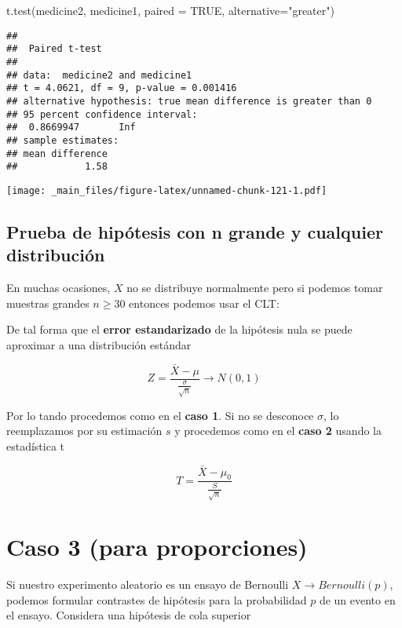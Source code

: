 \documentclass[
]{book}
\newenvironment{Shaded}{\begin{snugshade}}{\end{snugshade}}
\newcommand{\AttributeTok}[1]{\textcolor[rgb]{0.77,0.63,0.00}{#1}}
\newcommand{\ConstantTok}[1]{\textcolor[rgb]{0.00,0.00,0.00}{#1}}
\newcommand{\FunctionTok}[1]{\textcolor[rgb]{0.00,0.00,0.00}{#1}}
\newcommand{\NormalTok}[1]{#1}
\newcommand{\StringTok}[1]{\textcolor[rgb]{0.31,0.60,0.02}{#1}}
\begin{document}
\begin{Shaded}
\begin{Highlighting}[]
\FunctionTok{t.test}\NormalTok{(medicine2, medicine1,}
       \AttributeTok{paired =} \ConstantTok{TRUE}\NormalTok{,}
       \AttributeTok{alternative=}\StringTok{"greater"}\NormalTok{)}
\end{Highlighting}
\end{Shaded}

\begin{verbatim}
## 
##  Paired t-test
## 
## data:  medicine2 and medicine1
## t = 4.0621, df = 9, p-value = 0.001416
## alternative hypothesis: true mean difference is greater than 0
## 95 percent confidence interval:
##  0.8669947       Inf
## sample estimates:
## mean difference 
##            1.58
\end{verbatim}

\texttt{[image: \_main\_files/figure-latex/unnamed-chunk-121-1.pdf]}

\hypertarget{prueba-de-hipuxf3tesis-con-n-grande-y-cualquier-distribuciuxf3n}{%
\subsection{Prueba de hipótesis con n grande y cualquier distribución}\label{prueba-de-hipuxf3tesis-con-n-grande-y-cualquier-distribuciuxf3n}}

En muchas ocasiones, \(X\) no se distribuye normalmente pero si podemos tomar muestras grandes \(n \ge 30\) entonces podemos usar el CLT:

De tal forma que el \textbf{error estandarizado} de la hipótesis nula se puede aproximar a una distribución estándar

\[Z=\frac{\bar{X}-\mu}{\frac{\sigma}{\sqrt{n}}} \rightarrow N(0,1)\]

Por lo tando procedemos como en el \textbf{caso 1}. Si no se desconoce \(\sigma\), lo reemplazamos por su estimación \(s\) y procedemos como en el \textbf{caso 2} usando la estadística t

\[T=\frac{\bar{X}-\mu_0}{\frac{S}{\sqrt{n}}}\]

\hypertarget{caso-3-para-proporciones}{%
\section{Caso 3 (para proporciones)}\label{caso-3-para-proporciones}}

Si nuestro experimento aleatorio es un ensayo de Bernoulli \(X \rightarrow Bernoulli(p)\), podemos formular contrastes de hipótesis para la probabilidad \(p\) de un evento en el ensayo. Considera una hipótesis de cola superior
\end{document}
